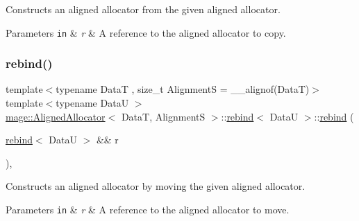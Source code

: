 Constructs an aligned allocator from the given aligned allocator.


\begin{DoxyParams}[1]{Parameters}
\mbox{\tt in}  & {\em r} & A reference to the aligned allocator to copy. \\
\hline
\end{DoxyParams}
\hypertarget{structmage_1_1_aligned_allocator_1_1rebind_a0d0459ad0a109f7ba32cd9979d0c276d}{}\label{structmage_1_1_aligned_allocator_1_1rebind_a0d0459ad0a109f7ba32cd9979d0c276d} 
\subsubsection{\texorpdfstring{rebind()}{rebind()}\hspace{0.1cm}{\footnotesize\ttfamily [3/3]}}
{\footnotesize\ttfamily template$<$typename DataT , size\+\_\+t AlignmentS = \+\_\+\+\_\+alignof(\+Data\+T)$>$ \\
template$<$typename DataU $>$ \\
\hyperlink{structmage_1_1_aligned_allocator}{mage\+::\+Aligned\+Allocator}$<$ DataT, AlignmentS $>$\+::\hyperlink{structmage_1_1_aligned_allocator_1_1rebind}{rebind}$<$ DataU $>$\+::\hyperlink{structmage_1_1_aligned_allocator_1_1rebind}{rebind} (\begin{DoxyParamCaption}\item[{\hyperlink{structmage_1_1_aligned_allocator_1_1rebind}{rebind}$<$ DataU $>$ \&\&}]{r }\end{DoxyParamCaption})\hspace{0.3cm}{\ttfamily [private]}, {\ttfamily [delete]}}

Constructs an aligned allocator by moving the given aligned allocator.


\begin{DoxyParams}[1]{Parameters}
\mbox{\tt in}  & {\em r} & A reference to the aligned allocator to move. \\
\hline
\end{DoxyParams}
\hypertarget{structmage_1_1_aligned_allocator_1_1rebind_a6d49df31fc4f0a5122267be6ab8888a7}{}\label{structmage_1_1_aligned_allocator_1_1rebind_a6d49df31fc4f0a5122267be6ab8888a7} 
